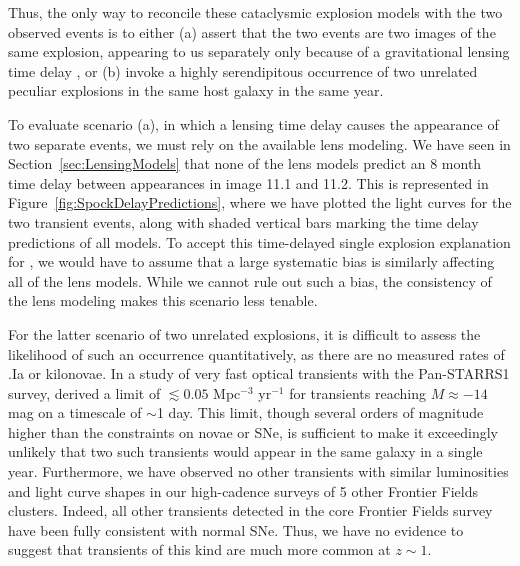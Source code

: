 Thus, the only way to reconcile these cataclysmic explosion models
with the two observed \spock events is to either (a) assert that the
two events are two images of the same explosion, appearing to us
separately only because of a gravitational lensing time delay
\citep[as was the case for the 5 images of SN
  Refsdal][]{Kelly:2015a,Kelly:2016}, or (b) invoke a highly
serendipitous occurrence of two unrelated peculiar explosions in the
same host galaxy in the same year.

To evaluate scenario (a), in which a lensing time delay causes the
appearance of two separate events, we must rely on the available lens
modeling. We have seen in Section~\ref{sec:LensingModels} that none of
the  lens models predict an 8 month time delay between
appearances in image 11.1 and 11.2.  This is represented in
Figure~\ref{fig:SpockDelayPredictions}, where we have plotted the
light curves for the two transient events, along with shaded vertical
bars marking the time delay predictions of all models.
To accept this time-delayed single explosion explanation for \spock,
we would have to assume that a large systematic bias is similarly
affecting all of the lens models.  While we cannot rule out such a
bias, the consistency of the lens modeling makes this scenario less
tenable.

For the latter scenario of two unrelated explosions, it is difficult
to assess the likelihood of such an occurrence quantitatively, as
there are no measured rates of .Ia or kilonovae.  In a study of very
fast optical transients with the Pan-STARRS1 survey,
\citet{Berger:2013b} derived a limit of $\lesssim0.05$ Mpc$^{-3}$
yr$^{-1}$ for transients reaching $M\approx -14$ mag on a timescale of
$\sim$1 day.  This limit, though several orders of magnitude higher
than the constraints on novae or SNe, is sufficient to make it
exceedingly unlikely that two such transients would appear in the same
galaxy in a single year.  Furthermore, we have observed no other
transients with similar luminosities and light curve shapes in our
high-cadence surveys of 5 other Frontier Fields clusters. Indeed, all
other transients detected in the core Frontier Fields survey have been
fully consistent with normal SNe.  Thus, we have no evidence to
suggest that transients of this kind are much more common at $z\sim1$.


